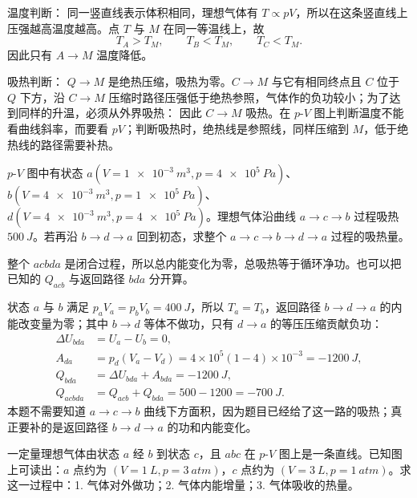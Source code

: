 \documentclass[lang=cn,11pt]{elegantbook}
\begin{document}
\begin{solution}
温度判断： 同一竖直线表示体积相同，理想气体有 \(T\propto pV\)，所以在这条竖直线上压强越高温度越高。点 \(T\) 与 \(M\) 在同一等温线上，故
\[
T_A>T_M,\qquad T_B<T_M,\qquad T_C<T_M.
\]
因此只有 \(A\to M\) 温度降低。

吸热判断： \(Q\to M\) 是绝热压缩，吸热为零。\(C\to M\) 与它有相同终点且 \(C\) 位于 \(Q\) 下方，沿 \(C\to M\) 压缩时路径压强低于绝热参照，气体作的负功较小；为了达到同样的升温，必须从外界吸热：
因此 \(C\to M\) 吸热。在 \(p\)-\(V\) 图上判断温度不能看曲线斜率，而要看 \(pV\)；判断吸热时，绝热线是参照线，同样压缩到 \(M\)，低于绝热线的路径需要补热。
\end{solution}

\begin{exercise}[2015-2016期末：已知一路吸热时怎样求闭合路径吸热]
\(p\)-\(V\) 图中有状态 \(a( V=\SI{1e-3}{m^3},p=\SI{4e5}{Pa})\)、\(b( V=\SI{4e-3}{m^3},p=\SI{1e5}{Pa})\)、\(d( V=\SI{4e-3}{m^3},p=\SI{4e5}{Pa})\)。理想气体沿曲线 \(a\to c\to b\) 过程吸热 \(\SI{500}{J}\)。若再沿 \(b\to d\to a\) 回到初态，求整个 \(a\to c\to b\to d\to a\) 过程的吸热量。
\end{exercise}

\begin{solution}
整个 \(acbda\) 是闭合过程，所以总内能变化为零，总吸热等于循环净功。也可以把已知的 \(Q_{acb}\) 与返回路径 \(bda\) 分开算。

状态 \(a\) 与 \(b\) 满足 \(p_aV_a=p_bV_b=\SI{400}{J}\)，所以 \(T_a=T_b\)，返回路径 \(b\to d\to a\) 的内能改变量为零；其中 \(b\to d\) 等体不做功，只有 \(d\to a\) 的等压压缩贡献负功：
\[
\begin{aligned}
\Delta U_{bda}&=U_a-U_b=0,\\
A_{da}&=p_d(V_a-V_d)
=4\times10^5(1-4)\times10^{-3}
=\SI{-1200}{J},\\
Q_{bda}&=\Delta U_{bda}+A_{bda}=\SI{-1200}{J},\\
Q_{acbda}&=Q_{acb}+Q_{bda}=500-1200=\SI{-700}{J}.
\end{aligned}
\]
本题不需要知道 \(a\to c\to b\) 曲线下方面积，因为题目已经给了这一路的吸热；真正要补的是返回路径 \(b\to d\to a\) 的功和内能变化。
\end{solution}

\begin{exercise}[\(p\)-\(V\) 图上一条直线过程为什么能先看面积和温度]
一定量理想气体由状态 \(a\) 经 \(b\) 到状态 \(c\)，且 \(abc\) 在 \(p\)-\(V\) 图上是一条直线。已知图上可读出：\(a\) 点约为 \((V=\SI{1}{L},p=\SI{3}{atm})\)，\(c\) 点约为 \((V=\SI{3}{L},p=\SI{1}{atm})\)。求这一过程中：1. 气体对外做功；2. 气体内能增量；3. 气体吸收的热量。
\end{exercise}
\end{document}
